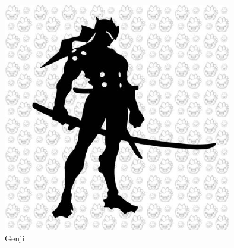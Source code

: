 \documentclass[a4paper]{article}
\begin{document}
\begin{figure}[h]
\centering
\includegraphics[width=10cm]{img/GENJI.jpg}
\caption{Genji}
\label{fig:Gengi}
\end{figure}
\end{document}
